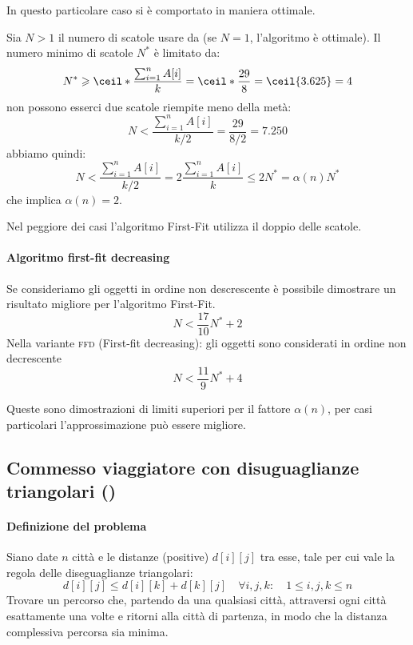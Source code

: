\begin{figure}[H]
	\centering
\end{figure}

In questo particolare caso si è comportato in maniera ottimale.

Sia \(N > 1\) il numero di scatole usare da {\firstFit} (se \(N=1\), l'algoritmo è ottimale).
Il numero minimo di scatole \(N^*\) è limitato da:
\[
	N^{*} \geqslant \ceil*{\frac{\sum_{i=1}^n A[i]}{k}} = \ceil*{\frac{29}{8}} = \ceil{3.625} = 4
\]
non possono esserci due scatole riempite meno della metà:
\[
	N < \frac{\sum_{i=1}^n A[i]}{k/2} = \frac{29}{8/2} = 7.250
\]
abbiamo quindi:
\[
	N < \frac{\sum_{i=1}^n A[i]}{k/2} = 2 \frac{\sum_{i=1}^n A[i]}{k} \leqslant 2N^* = \alpha(n) N^{*}
\]
che implica \(\alpha(n) = 2\).

\begin{note}
Nel peggiore dei casi l'algoritmo First-Fit utilizza il doppio delle scatole.
\end{note}

\paragraph{Algoritmo first-fit decreasing}
Se consideriamo gli oggetti in ordine non descrescente è possibile dimostrare un risultato migliore per l'algoritmo First-Fit.
\[
	N < \frac{17}{10} N^{*} + 2
\]
Nella variante \textsc{ffd} (First-fit decreasing): gli oggetti sono considerati in ordine non decrescente
\[
	N < \frac{11}{9} N^{*} + 4
\]
\begin{note}
Queste sono dimostrazioni di limiti superiori per il fattore \(\alpha(n)\), per casi particolari l'approssimazione può essere migliore.
\end{note}

\subsection{Commesso viaggiatore con disuguaglianze triangolari ({\deltaTsp})}

\paragraph{Definizione del problema}
Siano date \(n\) città e le distanze (positive) \(d[i][j]\) tra esse, \alert{tale per cui vale la regola delle diseguaglianze triangolari}:
\[
	d[i][j] \leqslant d[i][k] + d[k][j] \quad \forall i,j,k: \quad 1 \leqslant i,j,k \leqslant n
\]
Trovare un percorso che, partendo da una qualsiasi città, attraversi ogni città esattamente una volte e ritorni alla città di partenza, in modo che la distanza complessiva percorsa sia minima.


